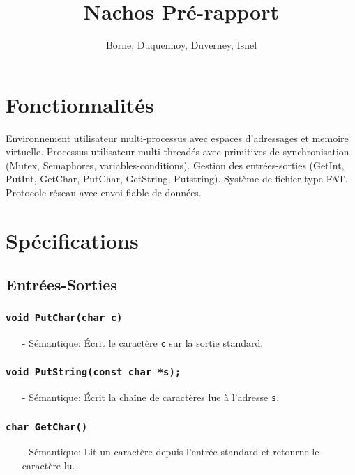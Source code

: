 \documentclass[11pt]{article}
\author{Borne, Duquennoy, Duverney, Isnel}
\date{}
\title{Nachos Pré-rapport}
\begin{document}
\maketitle



\section{Fonctionnalités}
Environnement utilisateur multi-processus avec espaces d'adressages et memoire virtuelle.
Processus utilisateur multi-threadés avec primitives de synchronisation (Mutex, Semaphores, variables-conditions).
Gestion des entrées-sorties (GetInt, PutInt, GetChar, PutChar, GetString, Putstring).
Système de fichier type FAT.
Protocole réseau avec envoi fiable de données.

\section{Spécifications}
\subsection{Entrées-Sorties}

\subsubsection{\texttt{void PutChar(char c)}}
\begin{itemize}
\item[-] Sémantique: Écrit le caractère \texttt{c} sur la sortie standard.
\end{itemize}

\subsubsection{\texttt{void PutString(const char *s);}}
\begin{itemize}
\item[-] Sémantique: Écrit la chaîne de caractères lue à l'adresse \texttt{s}.
\end{itemize}

\subsubsection{\texttt{char GetChar()}}
\begin{itemize}
\item[-] Sémantique: Lit un caractère depuis l'entrée standard et retourne le caractère lu.
\end{itemize}
\end{document}
